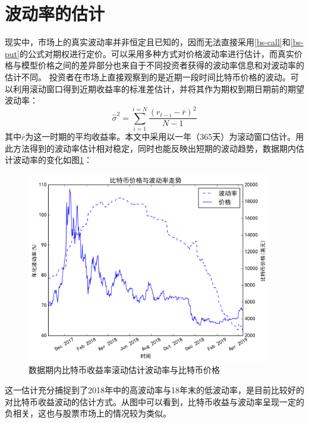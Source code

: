 \section{波动率的估计}\label{volatility-estimation}
现实中，市场上的真实波动率并非恒定且已知的，因而无法直接采用\ref{bs-call}和\ref{bs-put}的公式对期权进行定价。可以采用多种方式对价格波动率进行估计，而真实价格与模型价格之间的差异部分也来自于不同投资者获得的波动率信息和对波动率的估计不同。
投资者在市场上直接观察到的是近期一段时间比特币价格的波动。可以利用滚动窗口得到近期收益率的标准差估计，并将其作为期权到期日期前的期望波动率：
\begin{equation}\label{volatility-rolling}
\hat{\sigma}^2=\sum_{i=1}^{i=N}\frac{(r_{t-i}-\bar{r})^2}{N-1}
\end{equation}
其中$\bar{r}$为这一时期的平均收益率。本文中采用以一年（365天）为滚动窗口估计。用此方法得到的波动率估计相对稳定，同时也能反映出短期的波动趋势，数据期内估计波动率的变化如图\ref{fig:volatility}：
\begin{figure}[H]
\begin{small} 
\begin{center}
    \includegraphics[width=0.95\textwidth]{figures/volatility.png}
\end{center}
\caption{数据期内比特币收益率滚动估计波动率与比特币价格}
\label{fig:volatility}
\end{small}
\end{figure}
这一估计充分捕捉到了2018年中的高波动率与18年末的低波动率，是目前比较好的对比特币收益波动的估计方式。从图中可以看到，比特币收益与波动率呈现一定的负相关，这也与股票市场上的情况较为类似。
